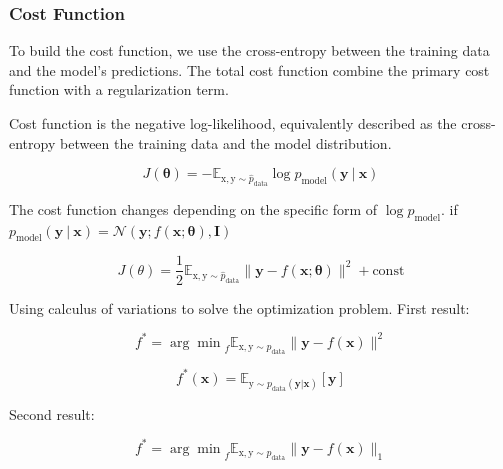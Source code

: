 
\subsubsection{Cost Function}
To build the cost function, we use the cross-entropy between the training data and the model’s predictions. The total cost function combine the primary cost function with a regularization term.

Cost function is the negative log-likelihood, equivalently described as the cross-entropy between the training data and the model distribution.

  \begin{equation} \tag{6.12}
   \label{eq_6_12}
    J( \bm{\theta} ) = - \mathbb{E} _ {\bm{\mathrm{x}}, \bm{\mathrm{y}} \sim \hat{p} _ \mathrm{data} } 
          \log p _ \mathrm{model} ( \bm{y}\ |\ \bm{x} )
  \end{equation}

The cost function changes depending on the specific form of $\log p _ \mathrm{model}$.
if $p _ \mathrm{model}(\bm{y}\ |\ \bm{x}) = \mathcal{N}(\bm{y}; f(\bm{x}; \bm{\theta}), \bm{I})$

  \begin{equation} \tag{6.13}
   \label{eq_6_13}
    J( \theta ) = \frac{1}{2} \mathbb{E} _ {\bm{\mathrm{x}}, \bm{\mathrm{y}} \sim \hat{p}_ \mathrm{data}}
        \| \bm{y} - f( \bm{x} ; \bm{\theta} ) \| ^ 2 + \mathrm{const}
  \end{equation}

Using calculus of variations to solve the optimization problem.
First result:

  \begin{equation} \tag{6.14}
   \label{eq_6_14}
   f ^ * = {\arg \min} _ {f} \mathbb{E} _ {\bm{\mathrm{x}}, \bm{\mathrm{y}} \sim p _ \mathrm{data}} 
       \| \bm{y} - f( \bm{x} ) \| ^ 2
  \end{equation}
  
  \begin{equation} \tag{6.15}
   \label{eq_6_15}
    f ^ * (\bm{x}) = \mathbb{E} _ {\bm{\mathrm{y}} \sim p _ \mathrm{data} ( \bm{y} | \bm{x} ) } [ \bm{y} ]
  \end{equation}
  
Second result:

  \begin{equation} \tag{6.16}
   \label{eq_6_16}
   f ^ * = {\arg \min} _ {f} \mathbb{E} _ {\bm{\mathrm{x}}, \bm{\mathrm{y}} \sim p _ \mathrm{data}} 
       \| \bm{y} - f( \bm{x} ) \| _ 1
  \end{equation}

